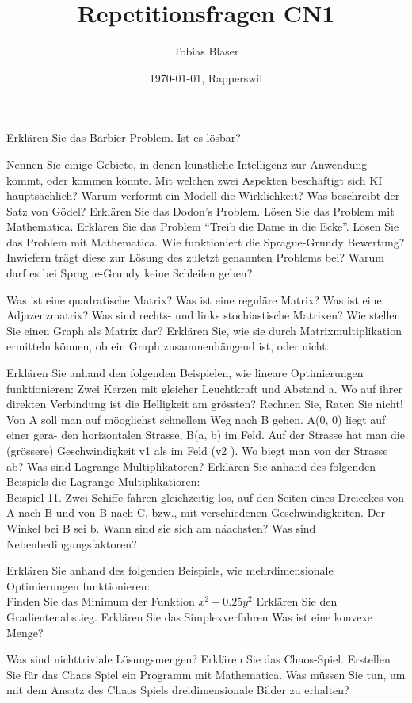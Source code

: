 \documentclass[ngerman,a4paper,12pt]{scrreprt}
\title{Repetitionsfragen CN1}
\author{Tobias Blaser}
\date{\today{}, Rapperswil}
\begin{document}
\tableofcontents
\clearpage

\ol
	\li Erklären Sie das Barbier Problem. Ist es lösbar?
\olS

\olR
	\li Nennen Sie einige Gebiete, in denen künstliche Intelligenz zur Anwendung kommt, oder kommen könnte.
	\li Mit welchen zwei Aspekten beschäftigt sich KI hauptsächlich?
	\li Warum verformt ein Modell die Wirklichkeit?
	\li Was beschreibt der Satz von Gödel?
	\li Erklären Sie das Dodon's Problem. Lösen Sie das Problem mit Mathematica.
	\li Erklären Sie das Problem ``Treib die Dame in die Ecke''. Lösen Sie das Problem mit Mathematica.
	\li Wie funktioniert die Sprague-Grundy Bewertung? Inwiefern trägt diese zur Lösung des zuletzt genannten Problems bei? Warum darf es bei Sprague-Grundy keine Schleifen geben?
\olS

\olR
	\li Was ist eine quadratische Matrix?
	\li Was ist eine reguläre Matrix?
	\li Was ist eine Adjazenzmatrix?
	\li Was sind rechts- und links stochiastische Matrixen?
	\li Wie stellen Sie einen Graph als Matrix dar?
	\li Erklären Sie, wie sie durch Matrixmultiplikation ermitteln können, ob ein Graph zusammenhängend ist, oder nicht.
\olS


\olR
	\li Erklären Sie anhand den folgenden Beispielen, wie lineare Optimierungen funktionieren:
		\ul
			\li Zwei Kerzen mit gleicher Leuchtkraft und Abstand a. Wo auf ihrer direkten Verbindung ist die Helligkeit am grössten? Rechnen Sie, Raten Sie nicht!
			\li Von A soll man auf möoglichst schnellem Weg nach B gehen. A(0, 0) liegt auf einer gera-
den horizontalen Strasse, B(a, b) im Feld. Auf der Strasse hat man die (grössere) Geschwindigkeit
v1 als im Feld (v2 ). Wo biegt man von der Strasse ab?
		\ulE
	\li Was sind Lagrange Multiplikatoren? Erklären Sie anhand des folgenden Beispiels die Lagrange Multiplikatioren: \\
		Beispiel 11. Zwei Schiffe fahren gleichzeitig los, auf den Seiten eines Dreieckes von A nach B und von B nach C, bzw., mit verschiedenen Geschwindigkeiten. Der Winkel bei B sei b. Wann sind
sie sich am näachsten?
	\li Was sind Nebenbedingungsfaktoren?
\olS

\olR
	\li Erklären Sie anhand des folgenden Beispiels, wie mehrdimensionale Optimierungen funktionieren: \\
		Finden Sie das Minimum der Funktion $x^2 + 0.25 y^2$
	\li Erklären Sie den Gradientenabstieg.
	\li Erklären Sie das Simplexverfahren
	\li Was ist eine konvexe Menge?
\olS


\olR
	\li Was sind nichttriviale Lösungsmengen?
	\li Erklären Sie das Chaos-Spiel.
	\li Erstellen Sie für das Chaos Spiel ein Programm mit Mathematica.
	\li Was müssen Sie tun, um mit dem Ansatz des Chaos Spiels dreidimensionale Bilder zu erhalten?
\olS


\end{document}
